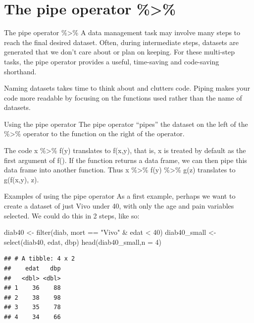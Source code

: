 \documentclass[
  ignorenonframetext,
]{beamer}
\newenvironment{Shaded}{\begin{snugshade}}{\end{snugshade}}
\newcommand{\AttributeTok}[1]{\textcolor[rgb]{0.77,0.63,0.00}{#1}}
\newcommand{\DecValTok}[1]{\textcolor[rgb]{0.00,0.00,0.81}{#1}}
\newcommand{\FunctionTok}[1]{\textcolor[rgb]{0.00,0.00,0.00}{#1}}
\newcommand{\NormalTok}[1]{#1}
\newcommand{\OtherTok}[1]{\textcolor[rgb]{0.56,0.35,0.01}{#1}}
\newcommand{\SpecialCharTok}[1]{\textcolor[rgb]{0.00,0.00,0.00}{#1}}
\newcommand{\StringTok}[1]{\textcolor[rgb]{0.31,0.60,0.02}{#1}}
\begin{document}
\hypertarget{the-pipe-operator}{%
\section{The pipe operator \%\textgreater\%}\label{the-pipe-operator}}

\begin{frame}{The pipe operator \%\textgreater\%}
\protect\hypertarget{the-pipe-operator-1}{}
A data management task may involve many steps to reach the final desired
dataset. Often, during intermediate steps, datasets are generated that
we don't care about or plan on keeping. For these multi-step tasks, the
pipe operator provides a useful, time-saving and code-saving shorthand.

Naming datasets takes time to think about and clutters code. Piping
makes your code more readable by focusing on the functions used rather
than the name of datasets.
\end{frame}

\begin{frame}{Using the pipe operator}
\protect\hypertarget{using-the-pipe-operator}{}
The pipe operator ``pipes'' the dataset on the left of the
\%\textgreater\% operator to the function on the right of the operator.

The code x \%\textgreater\% f(y) translates to f(x,y), that is, x is
treated by default as the first argument of f(). If the function returns
a data frame, we can then pipe this data frame into another function.
Thus x \%\textgreater\% f(y) \%\textgreater\% g(z) translates to
g(f(x,y), z).
\end{frame}

\begin{frame}[fragile]{Examples of using the pipe operator}
\protect\hypertarget{examples-of-using-the-pipe-operator}{}
As a first example, perhaps we want to create a dataset of just Vivo
under 40, with only the age and pain variables selected. We could do
this in 2 steps, like so:

\footnotesize

\begin{Shaded}
\begin{Highlighting}[]
\NormalTok{diab40 }\OtherTok{\textless{}{-}} \FunctionTok{filter}\NormalTok{(diab, mort }\SpecialCharTok{==} \StringTok{"Vivo"} \SpecialCharTok{\&}\NormalTok{ edat }\SpecialCharTok{\textless{}} \DecValTok{40}\NormalTok{)}
\NormalTok{diab40\_small }\OtherTok{\textless{}{-}} \FunctionTok{select}\NormalTok{(diab40, edat, dbp)}
\FunctionTok{head}\NormalTok{(diab40\_small,}\AttributeTok{n =} \DecValTok{4}\NormalTok{)}
\end{Highlighting}
\end{Shaded}

\begin{verbatim}
## # A tibble: 4 x 2
##    edat   dbp
##   <dbl> <dbl>
## 1    36    88
## 2    38    98
## 3    35    78
## 4    34    66
\end{verbatim}

\normalsize
\end{frame}
\end{document}
